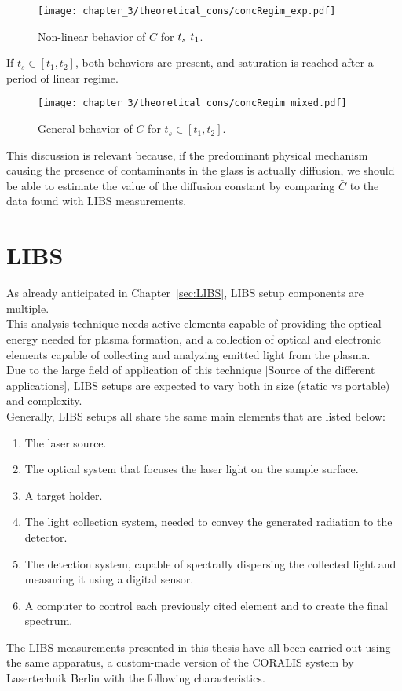 \begin{figure}[H]
   \centering
   \texttt{[image: chapter\_3/theoretical\_cons/concRegim\_exp.pdf]} 
    \vspace*{-30pt}
   \caption{Non-linear behavior of $\bar{C}$ for $\protect t_s ~ t_1$.}
   \label{fig:c_bar_non_linear}
\end{figure}
If $t_s \in [t_1, t_2]$, both behaviors are present, and saturation is reached after a period of linear regime.
\begin{figure}[H]
    \centering
    \texttt{[image: chapter\_3/theoretical\_cons/concRegim\_mixed.pdf]} 
     \vspace*{-30pt}
    \caption{General behavior of $\bar{C}$ for  $t_s \in [t_1, t_2]$.}
    \label{fig:c_bar_mixed}
 \end{figure}
This discussion is relevant because, if the predominant physical mechanism causing the presence of contaminants in the glass is actually diffusion, we should be able to estimate the value of the diffusion constant by comparing $\bar{C}$ to the data found with LIBS measurements.

\section{LIBS}
\label{sec:Description of the apparatus}
As already anticipated in Chapter~\ref{sec:LIBS}, LIBS setup components are multiple.
\\
This analysis technique needs active elements capable of providing the optical energy needed for plasma formation, and a collection of optical and electronic elements capable of collecting and analyzing emitted light from the plasma.
\\
Due to the large field of application of this technique [Source of the different applications], LIBS setups are expected to vary both in size (static vs portable) and complexity.
\\
Generally, LIBS setups all share the same main elements that are listed below:
\begin{enumerate}
    \item The laser source.
    \item The optical system that focuses the laser light on the sample surface.
    \item A target holder.
    \item The light collection system, needed to convey the generated radiation to the detector.
    \item The detection system, capable of spectrally dispersing the collected light and measuring it using a digital sensor.
    \item A computer to control each previously cited element and to create the final spectrum.
\end{enumerate}
The LIBS measurements presented in this thesis have all been carried out using the same apparatus, a custom-made version of the CORALIS system by Lasertechnik Berlin with the following characteristics.

